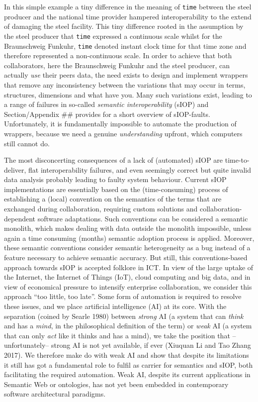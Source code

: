 \documentclass[a4paper,11pt,oneside,oldfontcommands]{memoir}
\newcounter{para}
\theoremstyle{definition}
\theoremstyle{break}		%
\numberwithin{equation}{chapter}
\numberwithin{figure}{chapter}
\begin{document}
In this simple example a tiny difference in the meaning of \texttt{time}
between the steel producer and the national time provider hampered
interoperability to the extend of damaging the steel facility. This tiny
difference rooted in the assumption by the steel producer that
\texttt{time} expressed a continuous scale whilst for the Braunschweig
Funkuhr, \texttt{time} denoted instant clock time for that time zone and
therefore represented a non-continuous scale. In order to achieve that
both collaborators, here the Braunschweig Funkuhr and the steel
producer, can actually \emph{use} their peers data, the need exists to
design and implement wrappers that remove any inconsistency between the
variations that may occur in terms, structures, dimensions and what have
you. Many such variations exist, leading to a range of failures in
so-called \emph{semantic interoperability} (sIOP) and Section/Appendix
\#\# provides for
a short overview of sIOP-faults. Unfortunately, it is fundamentally
impossible to automate the production of wrappers, because we need a
genuine \emph{understanding} upfront, which computers still cannot do.

The most disconcerting consequences of a lack of (automated) sIOP are
time-to-deliver, flat interoperability failures, and even seemingly
correct but quite invalid data analysis probably leading to faulty
system behaviour. Current sIOP implementations are essentially based on
the (time-consuming) process of establishing a (local) convention on the
semantics of the terms that are exchanged during collaboration,
requiring custom solutions and collaboration-dependent software
adaptations. Such conventions can be considered a semantic monolith,
which makes dealing with data outside the monolith impossible, unless
again a time consuming (months) semantic adoption process is applied.
Moreover, these semantic conventions consider semantic heterogeneity as
a bug instead of a feature necessary to achieve semantic accuracy. But
still, this conventions-based approach towards sIOP is accepted folklore
in ICT. In view of the large uptake of the Internet, the Internet of
Things (IoT), cloud computing and big data, and in view of economical
pressure to intensify enterprise collaboration, we consider this
approach ``too little, too late''. Some form of automation is required
to resolve these issues, and we place artificial intelligence (AI) at
its core. With the separation (coined by Searle 1980) between
\emph{strong} AI (a system that can \emph{think} and has a \emph{mind},
in the philosophical definition of the term) or \emph{weak} AI (a system
that can only \emph{act} like it thinks and has a mind), we take the
position that --unfortunately-- strong AI is not yet available, if ever
(Xiuquan Li and Tao Zhang 2017). We therefore make do with weak AI and
show that despite its limitations it still has got a fundamental role to
fulfil as carrier for semantics and sIOP, both facilitating the required
automation. Weak AI, despite its current applications in Semantic Web or
ontologies, has not yet been embedded in contemporary software
architectural paradigms.
\end{document}

